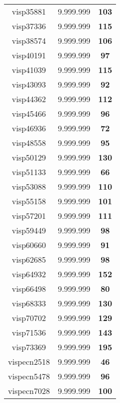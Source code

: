 \begin{tabular}{cc||c}
visp35881        & 9.999.999        & {\bf 103}       \\ 
visp37336        & 9.999.999        & {\bf 115}       \\ 
visp38574        & 9.999.999        & {\bf 106}       \\ 
visp40191        & 9.999.999        & {\bf 97}        \\ 
visp41039        & 9.999.999        & {\bf 115}       \\ 
visp43093        & 9.999.999        & {\bf 92}        \\ 
visp44362        & 9.999.999        & {\bf 112}       \\ 
visp45466        & 9.999.999        & {\bf 96}        \\ 
visp46936        & 9.999.999        & {\bf 72}        \\ 
visp48558        & 9.999.999        & {\bf 95}        \\ 
visp50129        & 9.999.999        & {\bf 130}       \\ 
visp51133        & 9.999.999        & {\bf 66}        \\ 
visp53088        & 9.999.999        & {\bf 110}       \\ 
visp55158        & 9.999.999        & {\bf 101}       \\ 
visp57201        & 9.999.999        & {\bf 111}       \\ 
visp59449        & 9.999.999        & {\bf 98}        \\ 
visp60660        & 9.999.999        & {\bf 91}        \\ 
visp62685        & 9.999.999        & {\bf 98}        \\ 
visp64932        & 9.999.999        & {\bf 152}       \\ 
visp66498        & 9.999.999        & {\bf 80}        \\ 
visp68333        & 9.999.999        & {\bf 130}       \\ 
visp70702        & 9.999.999        & {\bf 129}       \\ 
visp71536        & 9.999.999        & {\bf 143}       \\ 
visp73369        & 9.999.999        & {\bf 195}       \\ 
vispecn2518      & 9.999.999        & {\bf 46}        \\ 
vispecn5478      & 9.999.999        & {\bf 96}        \\ 
vispecn7028      & 9.999.999        & {\bf 100}       \\ 

\end{tabular}
